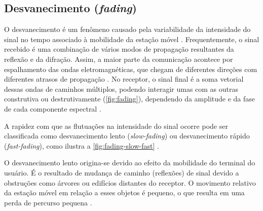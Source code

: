 \subsection{Desvanecimento (\textit{fading})}
\label{sub:desvanecimento}

O desvanecimento é um fenômeno causado pela variabilidade da intensidade do sinal no tempo associado à mobilidade da estação móvel \cite{haykin2008,rappaport2009}. Frequentemente, o sinal recebido é uma combinação de vários modos de propagação resultantes da reflexão e da difração. Assim, a maior parte da comunicação acontece por espalhamento das ondas eletromagnéticas, que chegam de diferentes direções com diferentes atrasos de propagação \cite{haykin2008}. No receptor, o sinal final é a soma vetorial dessas ondas de caminhos múltiplos, podendo interagir umas com as outras construtiva ou destrutivamente (\autoref{fig:fading}), dependendo da amplitude e da fase de cada componente espectral \cite{haykin2008}.

\begin{figure}[H]
	\centering
\end{figure}

A rapidez com que as flutuações na intensidade do sinal ocorre pode ser classificada como desvanecimento lento (\textit{slow-fading}) ou desvanecimento rápido (\textit{fast-fading}), como ilustra a \autoref{fig:fading-slow-fast} \cite{haykin2008}.

O desvanecimento lento origina-se devido ao efeito da mobilidade do terminal do usuário. É o resultado de mudança de caminho (reflexões) de sinal devido a obstruções como árvores ou edifícios distantes do receptor. O movimento relativo da estação móvel em relação a esses objetos é pequeno, o que resulta em uma perda de percurso pequena \cite{haykin2008}.

